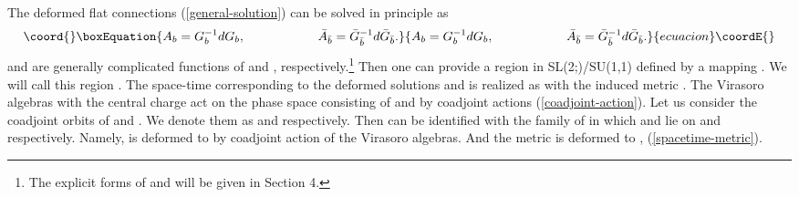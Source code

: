 \documentclass[a4paper,11pt]{article}
\begin{document}
The deformed flat connections (\ref{general-solution}) can be solved 
in principle as 
\begin{equation}\coord{}\boxEquation{
\label{G_b}
A_b=G_b^{-1}dG_b, \hspace{20mm} 
\bar{A}_{\bar{b}}=\bar{G}_{\bar{b}}^{-1}d\bar{G}_{\bar{b}}.
}{
A_b=G_b^{-1}dG_b, \hspace{20mm} 
\bar{A}_{\bar{b}}=\bar{G}_{\bar{b}}^{-1}d\bar{G}_{\bar{b}}.
}{ecuacion}\coordE{}\end{equation}
\coordHE{} and \coordHE{} are generally complicated functions of 
\coordHE{} and \coordHE{}, respectively.\footnote{
The explicit forms of \coordHE{} and \coordHE{} will be given 
in Section 4.}
Then one can provide a region in SL(2;\coordHE{})/SU(1,1) defined by 
a mapping 
\coordHE{}. 
We will call this region \coordHE{}.
The space-time corresponding to the deformed solutions 
\coordHE{} and \coordHE{} is realized as  \coordHE{}  
with the induced metric 
\coordHE{}.
The Virasoro algebras with the central charge \coordHE{} act on the phase space
consisting of \coordHE{} and \coordHE{} by coadjoint actions
(\ref{coadjoint-action}). 
Let us consider the coadjoint orbits of \coordHE{} 
and \coordHE{}.
We denote them as \coordHE{} and \coordHE{} respectively. 
Then \coordHE{} can be identified with 
the family of \coordHE{} in which \coordHE{} and \coordHE{} 
lie on \coordHE{} and \coordHE{} respectively.
Namely, \coordHE{} 
is deformed to \coordHE{} by coadjoint action of 
the Virasoro algebras.
And the metric \coordHE{} is deformed to 
\coordHE{}, (\ref{spacetime-metric}).
\end{document}
